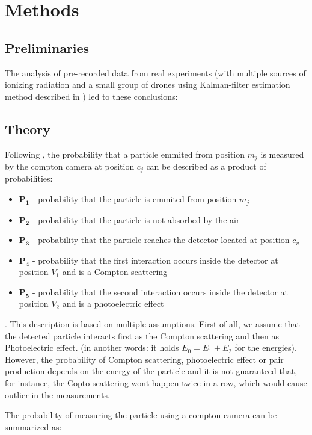 
\chapter{Methods}


\section{Preliminaries}
The analysis of pre-recorded data from real experiments (with multiple sources of ionizing radiation and a small group of drones using Kalman-filter estimation method described in \cite{Baca}) led to these conclusions:

\section{Theory}
Following , the probability that a particle emmited from position $m_{j}$ is measured by the compton camera at position $c_{j}$ can be described as a product of probabilities:
\begin{itemize}
  \item $\mathbf{P_{1}}$ - probability that the particle is emmited from position $m_{j}$
  \item $\mathbf{P_{2}}$ - probability that the particle is not absorbed by the air
  \item $\mathbf{P_{3}}$ - probability that the particle reaches the detector located at position $c_{v}$
	\item $\mathbf{P_{4}}$ - probability that the first interaction occurs inside the detector at position $V_{1}$ and is a Compton scattering
  \item $\mathbf{P_{5}}$ - probability that the second interaction occurs inside the detector at position $V_{2}$ and is a photoelectric effect
\end{itemize}.
This description is based on multiple assumptions.
First of all, we assume that the detected particle interacts first as the Compton scattering and then as Photoelectric effect. 
(in another words: it holds $E_{0} = E_{1} + E_{2}$ for the energies).
However, the probability of Compton scattering, photoelectric effect or pair production depends on the energy of the particle and it is not guaranteed that, for instance, the Copto scattering wont happen twice in a row, which would cause outlier in the measurements.

The probability of measuring the particle using a compton camera can be summarized as:

